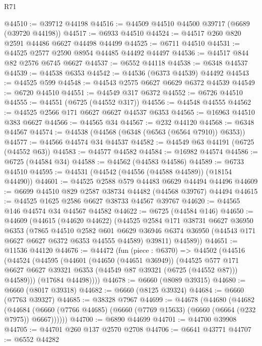 \begin{lexlean}{R71}
\begin{coremodule}
@44510 := @39712 @44198
@44516 := @44509 @44510 @44500 @39717 (@6689 (@39720 @44198))
@44517 := @6933 @44510
@44524 := @44517 @260 @820 @2591 @44486 @6627 @44498 @44499
@44525 := @6711 @44510
@44531 := @44525 @2577 @2590 @8954 @44485 @44492 @44497
@44536 := @44517 @844 @82 @2576 @6745 @6627
@44537 := @6552 @44118
@44538 := @6348 @44537
@44539 := @44538 @6353
@44542 := @44536 (@6373 @44539) @44492
@44543 := @44525 @599
@44548 := @44543 @2575 @6627 @6629 @6372 @44539
@44549 := @6720 @44510
@44551 := @44549 @317 @6372
@44552 := @6726 @44510
@44555 := @44551 (@6725 (@44552 @317))
@44556 := @44548 @44555
@44562 := @44525 @2566 @171 @6627 @6627 @44537 @6353
@44565 := @16963 @44510 @383 @6627
@44566 := @44565 @34
@44567 := @232 @44120
@44568 := @6348 @44567
@44574 := @44538 (@44568 (@6348 (@6563 (@6564 @7910)) @6353))
@44577 := @44566 @44574 @34 @44537
@44582 := @44549 @63 @44191 (@6725 (@44552 @63))
@44583 := @44577 @44582
@44584 := @16982 @44574
@44586 := @6725 (@44584 @34)
@44588 := @44562 (@44583 @44586)
@44589 := @6733 @44510
@44595 := @44531 (@44542 (@44556 (@44588 @44589)) (@18154 @44490))
@44601 := @44525 @2588 @579 @44483 @6629 @44494 @44496
@44609 := @6699 @44510 @829 @2587 @38734 @44482 (@44568 @39767) @44494
@44615 := @44525 @1625 @2586 @6627 @38733 @44567 @39767
@44620 := @44565 @146 @44574 @34 @44567 @44582
@44622 := @6725 (@44584 @146)
@44650 := @44609
    (@44615
      (@44620 @44622)
      (@44525
        @2584
        @171
        @38731
        @6627
        @36950
        @6353
        (@7865
          @44510
          @2582
          @601
          @6629
          @36946
          @6374
          @36950
          (@44543 @171 @6627 @6627 @6372 @6353 @44555 @44589)
          @39811)
        @44589))
@44651 := @11536 @44120
@44676 := @44472
    (fun (piece : @6370) =>
    @44502
      (@44516
        (@44524
          (@44595
            (@44601
              (@44650 (@44651 @36949))
              (@44525
                @577
                @171
                @6627
                @6627
                @39321
                @6353
                (@44549 @87 @39321 (@6725 (@44552 @87)))
                @44589)))
          (@17684 @44498))))
@44678 := @6660 (@8089 @39315)
@44680 := @6660 (@8017 @39318)
@44682 := @6660 (@8125 @39324)
@44684 := @6660 (@7763 @39327)
@44685 := @38328 @7967
@44699 := @44678
    (@44680
      (@44682
        (@44684 (@6660 (@7766 @44685) (@6660 (@7769 @15633) (@6660 (@6664 (@232 @7975)) @6667))))))
@44700 := @6890 @44699
@44701 := @44700 @39908
@44705 := @44701 @260 @137 @2570 @2708
@44706 := @6641 @43771
@44707 := @6552 @44282

\end{coremodule}
\end{lexlean}
